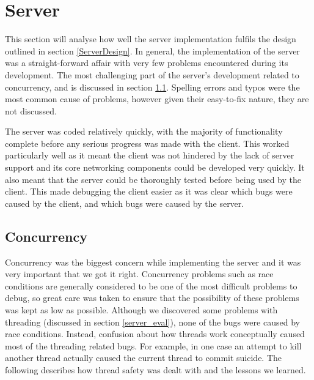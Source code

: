 \section{Server}
\label{serverimpl}

This section will analyse how well the server implementation fulfils the design outlined in section \ref{ServerDesign}. In general, the implementation of the server was a straight-forward affair with very few problems encountered during its development. The most challenging part of the server's development related to concurrency, and is discussed in section \ref{concur}. Spelling errors and typos were the most common cause of problems, however given their easy-to-fix nature, they are not discussed.

The server was coded relatively quickly, with the majority of functionality complete before any serious progress was made with the client. This worked particularly well as it meant the client was not hindered by the lack of server support and its core networking components could be developed very quickly. It also meant that the server could be thoroughly tested before being used by the client. This made debugging the client easier as it was clear which bugs were caused by the client, and which bugs were caused by the server.

\subsection{Concurrency}
\label{concur}
Concurrency was the biggest concern while implementing the server and it was very important that we got it right. Concurrency problems such as race conditions are generally considered to be one of the most difficult problems to debug, so great care was taken to ensure that the possibility of these problems was kept as low as possible. Although we discovered some problems with threading (discussed in section \ref{server_eval}), none of the bugs were caused by race conditions. Instead, confusion about how threads work conceptually caused most of the threading related bugs. For example, in one case an attempt to kill another thread actually caused the current thread to commit suicide. The following describes how thread safety was dealt with and the lessons we learned.

